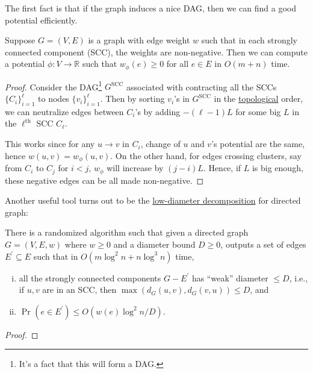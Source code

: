 The first fact is that if the graph induces a nice DAG, then we can find a good potential efficiently.

\begin{lemma}\label{lma:SSSP-fix-DAG}
	Suppose \(G = (V, E)\) is a graph with edge weight \(w\) such that in each strongly connected component (SCC), the weights are non-negative. Then we can compute a potential \(\phi \colon V \to \mathbb{R} \) such that \(w_{\phi } (e) \geq 0\) for all \(e \in E\) in \(O(m + n)\) time.
\end{lemma}
\begin{proof}
	Consider the DAG\footnote{It's a fact that this will form a DAG.} \(G^{\text{SCC} }\) associated with contracting all the SCCs \(\{ C_i \} _{i=1}^{\ell }\) to nodes \(\{ v_i \} _{i=1}^{\ell }\). Then by sorting \(v_i\)'s in \(G^{\text{SCC} }\) in the \href{https://en.wikipedia.org/wiki/Topological_sorting}{topological} order, we can neutralize edges between \(C_i\)'s by adding \(- (\ell - 1) L\) for some big \(L\) in the \(\ell ^{\text{th} }\) SCC \(C_{\ell } \).
	\begin{center}
	\end{center}
	This works since for any \(u \to v\) in \(C_i\), change of \(u\) and \(v\)'s potential are the same, hence \(w (u, v)= w_{\phi }(u, v) \). On the other hand, for edges crossing clusters, say from \(C_i\) to \(C_j\) for \(i < j\), \(w_{\phi } \) will increase by \((j-i) L\). Hence, if \(L\) is big enough, these negative edges can be all made non-negative.
\end{proof}

Another useful tool turns out to be the \hyperref[def:low-diameter-decomposition]{low-diameter decomposition} for directed graph:

\begin{theorem}\label{thm:directed-LDD}
	There is a randomized algorithm such that given a directed graph \(G = (V, E, w)\) where \(w \geq 0\) and a diameter bound \(D \geq 0\), outputs a set of edges \(E^{\prime} \subseteq E\) such that in \(O(m \log ^2 n + n \log ^3 n)\) time,
	\begin{enumerate}[(i)]
		\item all the strongly connected components \(G - E^{\prime} \) has ``weak'' diameter \(\leq D\), i.e., if \(u, v\) are in an SCC, then \(\max (d_G(u, v), d_G(v, u)) \leq D\), and
		\item \(\Pr_{}(e \in E^{\prime} ) \leq O(w(e) \log ^2 n / D)\).
	\end{enumerate}
\end{theorem}
\begin{proof}
\end{proof}

